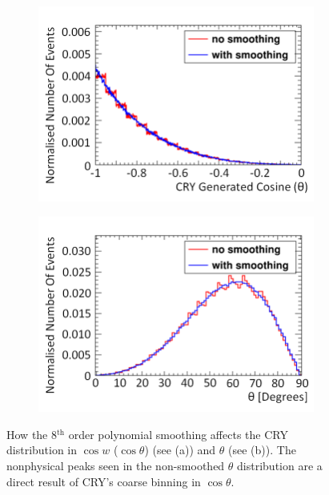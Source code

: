 \begin{figure}[!h]
\centering
\begin{subfigure}{.5\textwidth}
  \centering
  \includegraphics[width=\linewidth]{Chapter4/Figs/Raster/CryPlots/CrySmoothingCosineMedText.png}
  \captionsetup{width=.9\linewidth}
  \caption{}
  \label{subFig:CrySmoothingCosine}
\end{subfigure}%
\begin{subfigure}{.5\textwidth}
  \centering
  \includegraphics[width=\linewidth]{Chapter4/Figs/Raster/CryPlots/CrySmoothingThetaMedText.png}
  \captionsetup{width=.9\linewidth}
  \caption{}
  \label{subFig:CrySmoothingTheta}
\end{subfigure}
\caption[How the 8$^\textrm{th}$ order polynomial smoothing affects the CRY distribution in $\cos{w}$.]{How the 8$^\textrm{th}$ order polynomial smoothing affects the CRY distribution in $\cos{w}$ ($\cos{\theta}$) (see (a)) and $\theta$ (see (b)). The nonphysical peaks seen in the non-smoothed $\theta$ distribution are a direct result of CRY's coarse binning in $\cos{\theta}$.}
\label{fig:CrySmoothingCosTheta}
\end{figure}

